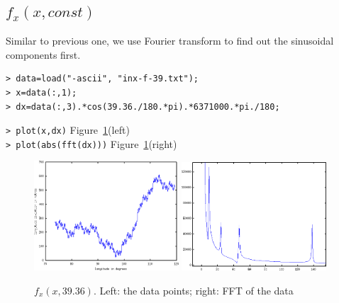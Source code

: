\documentclass[a4paper]{article}
\begin{document}
\subsection{$f_x(x, const)$}
Similar to previous one, we use Fourier transform to find out the sinusoidal
components first.
\begin{verbatim}
> data=load("-ascii", "inx-f-39.txt");
> x=data(:,1);
> dx=data(:,3).*cos(39.36./180.*pi).*6371000.*pi./180;
\end{verbatim}
\verb|> plot(x,dx)| \hfill Figure~\ref{fig:fxx-fft}(left) \\
\verb|> plot(abs(fft(dx)))| \hfill Figure~\ref{fig:fxx-fft}(right) \\

\begin{figure}[htb]
\begin{center}
\includegraphics[width=0.48\textwidth]{fxx-data.png}
\includegraphics[width=0.48\textwidth]{fxx-fft.png}
\end{center}
\caption{$f_x(x,39.36)$. Left: the data points; right: FFT of the data}
\label{fig:fxx-fft}
\end{figure}
\end{document}
